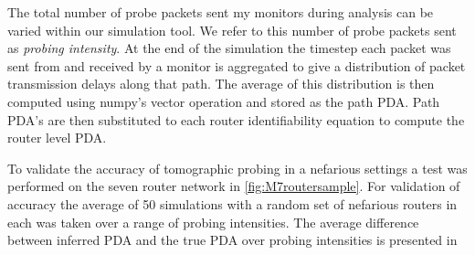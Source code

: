 The total number of probe packets sent my monitors during analysis can be varied within our simulation tool. We refer to this number of probe packets sent as \textit{probing intensity}. At the end of the simulation the timestep each packet was sent from and received by a monitor is aggregated to give a distribution of packet transmission delays along that path. The average of this distribution is then computed using numpy's vector operation and stored as the path PDA. Path PDA's are then substituted to each router identifiability equation to compute the router level PDA.\par
To validate the accuracy of tomographic probing in a nefarious settings a test was performed on  the seven router network in \cref{fig:M7routersample}. For validation of accuracy the average of 50 simulations with a random set of nefarious routers in each was taken over a range of probing intensities. The average difference between inferred PDA and the true PDA over probing intensities is presented in 
